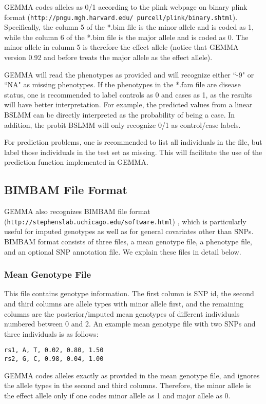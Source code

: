 \documentclass[11pt]{article}
\providecommand{\url}[1]{\texttt{#1}}
\begin{document}
GEMMA codes alleles as 0/1 according to the plink webpage on binary
plink format
(\url{http://pngu.mgh.harvard.edu/~purcell/plink/binary.shtml}). Specifically,
the column 5 of the *.bim file is the minor allele and is coded as 1,
while the column 6 of the *.bim file is the major allele and is coded
as 0. The minor allele in column 5 is therefore the effect allele
(notice that GEMMA version 0.92 and before treats the major allele as
the effect allele).

GEMMA will read the phenotypes as provided and will recognize either
``-9" or ``NA" as missing phenotypes. If the phenotypes in the *.fam
file are disease status, one is recommended to label controls as 0 and
cases as 1, as the results will have better interpretation. For
example, the predicted values from a linear BSLMM can be directly
interpreted as the probability of being a case.  In addition, the
probit BSLMM will only recognize 0/1 as control/case labels.

For prediction problems, one is recommended to list all individuals in
the file, but label those individuals in the test set as missing. This
will facilitate the use of the prediction function implemented in
GEMMA.

\subsection{BIMBAM File Format}

GEMMA also recognizes BIMBAM file format
(\url{http://stephenslab.uchicago.edu/software.html})
\cite{Guan:2008}, which is particularly useful for imputed genotypes
as well as for general covariates other than SNPs. BIMBAM format
consists of three files, a mean genotype file, a phenotype file, and
an optional SNP annotation file. We explain these files in detail
below.

\subsubsection{Mean Genotype File}

This file contains genotype information. The first column is SNP id,
the second and third columns are allele types with minor allele first,
and the remaining columns are the posterior/imputed mean genotypes of
different individuals numbered between 0 and 2. An example mean
genotype file with two SNPs and three individuals is as follows:
%
\begin{verbatim}
rs1, A, T, 0.02, 0.80, 1.50
rs2, G, C, 0.98, 0.04, 1.00
\end{verbatim}
%
GEMMA codes alleles exactly as provided in the mean genotype file, and
ignores the allele types in the second and third columns. Therefore,
the minor allele is the effect allele only if one codes minor allele
as 1 and major allele as 0.
\end{document}
